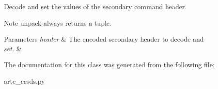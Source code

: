 Decode and set the values of the secondary command header. 

\begin{DoxyNote}{Note}
unpack always returns a tuple.
\end{DoxyNote}

\begin{DoxyParams}{Parameters}
{\em header} & The encoded secondary header to decode and \\
\hline
{\em set.} & \\
\hline
\end{DoxyParams}


The documentation for this class was generated from the following file\+:\begin{DoxyCompactItemize}
\item 
arte\+\_\+ccsds.\+py\end{DoxyCompactItemize}
